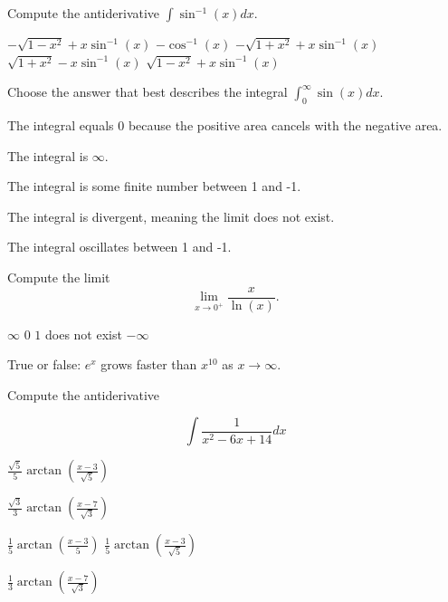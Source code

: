 \documentclass[10pt]{exam}
\begin{document}
\begin{questions}
\question \label{parts} Compute the antiderivative $\int \sin^{-1}(x)dx$.

\begin{choices} %

\choice $-\sqrt{1-x^2} + x\sin^{-1}(x)$
\choice $-\cos^{-1}(x)$
\choice $-\sqrt{1+x^2} + x\sin^{-1}(x)$
\choice $\sqrt{1+x^2} - x\sin^{-1}(x)$
	\choice $\sqrt{1-x^2} + x\sin^{-1}(x)$
\end{choices}


\question Choose the answer that best describes the integral 
$\int_0^\infty \sin(x) dx$.

\begin{choices} %
\choice The integral equals 0 because the positive area cancels with the negative area.

\choice The integral  is $\infty$.

\choice The integral  is some finite number between 1 and -1.

\choice The integral is divergent, meaning the limit does not exist.

\choice The integral oscillates between 1 and -1.


	
\end{choices}


\question Compute the limit $$\lim_{x\to 0^+} \frac{x}{\ln(x)}.$$

\begin{choices}
\choice $\infty$
\choice $0$
\choice $1$
\choice does not exist
\choice $-\infty$
	
\end{choices}




\question True or false: $e^x$ grows faster than $x^{10}$ as $x \to \infty$.


\question Compute the antiderivative 

$$\int \frac{1}{x^2-6x+14}dx$$

\begin{choices} %
\choice $\frac{\sqrt{5}}{5} \arctan(\frac{x-3}{\sqrt{5}})$

\choice $\frac{\sqrt{3}}{3} \arctan(\frac{x-7}{\sqrt{3}})$

\choice $\frac{1}{5}\arctan(\frac{x-3}{5})$
\choice $\frac{1}{5}\arctan(\frac{x-3}{\sqrt{5}})$

\choice $\frac{1}{3}\arctan(\frac{x-7}{\sqrt{3}})$


	
\end{choices}




\end{questions}
\end{document}
